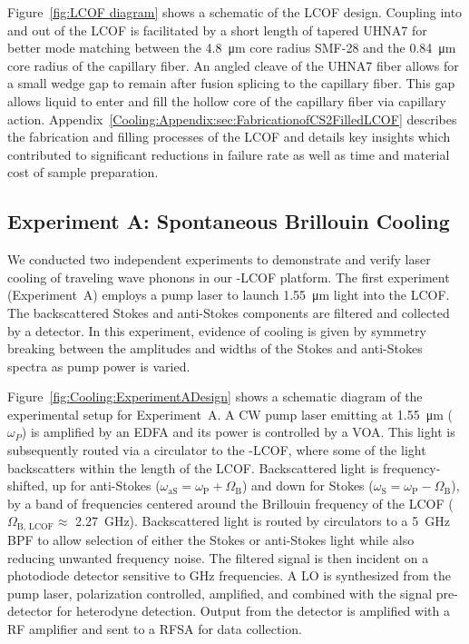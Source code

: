 Figure~\ref{fig:LCOF diagram} shows a schematic of the \ac{LCOF} design. Coupling into and out of the \ac{LCOF} is facilitated by a short length of tapered \ac{UHNA7} for better mode matching between the \SI{4.8}{\micro\meter} core radius \ac{SMF-28} and the \SI{0.84}{\micro\meter} core radius of the capillary fiber. An angled cleave of the \ac{UHNA7} fiber allows for a small wedge gap to remain after fusion splicing to the capillary fiber. This gap allows liquid  to enter and fill the hollow core of the capillary fiber via capillary action. Appendix~\ref{Cooling:Appendix:sec:FabricationofCS2FilledLCOF} describes the fabrication and filling processes of the \ac{LCOF} and details key insights which contributed to significant reductions in failure rate as well as time and material cost of sample preparation.


\subsection{Experiment A: Spontaneous Brillouin Cooling}
\label{Cooling:subsec:ExperimentASpontaneousBrillouinCooling}

We conducted two independent experiments to demonstrate and verify laser cooling of traveling wave phonons in our -\ac{LCOF} platform. The first experiment (Experiment~A) employs a pump laser to launch \SI{1.55}{\micro\meter} light into the \ac{LCOF}. The backscattered Stokes and anti-Stokes components are filtered and collected by a detector. In this experiment, evidence of cooling is given by symmetry breaking between the amplitudes and widths of the Stokes and anti-Stokes spectra as pump power is varied.

Figure~\ref{fig:Cooling:ExperimentADesign} shows a schematic diagram of the experimental setup for Experiment~A. A \ac{CW} pump laser emitting at \SI{1.55}{\micro\meter} (\(\omega_{P}\)) is amplified by an \ac{EDFA} and its power is controlled by a \ac{VOA}. This light is subsequently routed via a circulator to the -\ac{LCOF}, where some of the light backscatters within the length of the \ac{LCOF}. Backscattered light is frequency-shifted, up for anti-Stokes (\(\omega_{\mathrm{aS}} = \omega_{\mathrm{P}} + \Omega_{\mathrm{B}}\)) and down for Stokes
(\(\omega_{\mathrm{S}} = \omega_{\mathrm{P}} - \Omega_{\mathrm{B}}\)),
by a band of frequencies centered around the Brillouin frequency of the \ac{LCOF} (\(\Omega_{\mathrm{B,\,LCOF}} \approx\) \SI{2.27}{\giga\hertz}). Backscattered light is routed by circulators to a \SI{5}{\giga\hertz} \ac{BPF} to allow selection of either the Stokes or anti-Stokes light while also reducing unwanted frequency noise. The filtered signal is then incident on a photodiode detector sensitive to \si{\giga\hertz} frequencies. A \ac{LO} is synthesized from the pump laser, polarization controlled, amplified, and combined with the signal pre-detector for heterodyne detection. Output from the detector is amplified with a \ac{RF} amplifier and sent to a \ac{RFSA} for data collection.

